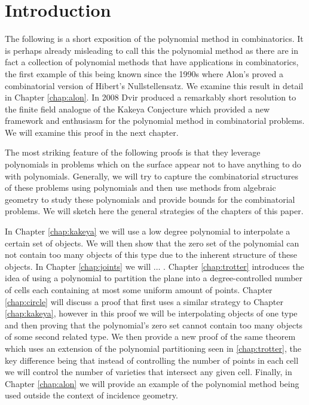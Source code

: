 \chapter{Introduction}

The following is a short exposition of the polynomial method in combinatorics. 
It is perhaps already misleading to call this the polynomial method 
as there are in fact a collection of polynomial methods that have applications in combinatorics, the first example of this being known since the 1990s
where Alon's proved a combinatorial version of Hibert's Nullstellensatz.\cite{alon1999combinatorial} We examine this result in detail
in Chapter \ref{chap:alon}. In 2008 Dvir produced a remarkably short resolution to the finite field analogue of the Kakeya Conjecture which provided
a new framework and enthusiasm for the polynomial method in combinatorial problems. We will examine this proof in the next chapter. 

The most striking feature of the following proofs is that they leverage polynomials in problems which on the surface appear not to have anything to 
do with polynomials. Generally, we will try to capture the combinatorial structures of these problems using polynomials and then use methods from algebraic
geometry to study these polynomials and provide bounds for the combinatorial problems.
We will sketch here the general strategies of the chapters of this paper.

In Chapter \ref{chap:kakeya} we will use a low degree polynomial to interpolate a certain set of objects. We will then show that the zero set of the polynomial can not contain 
too many objects of this type due to the inherent structure of these objects. In Chapter \ref{chap:joints} we will $\dots$ .
Chapter \ref{chap:trotter} introduces the idea of using a polynomial to partition the plane into a degree-controlled number of cells each containing at most some uniform amount of points.
Chapter \ref{chap:circle} will discuss a proof that first uses a similar strategy to Chapter \ref{chap:kakeya}, however in this proof we will be interpolating
objects of one type and then proving that the polynomial's zero set cannot contain too many objects of some second related type. 
We then provide a new proof of the same theorem which uses an extension of the polynomial partitioning seen in \ref{chap:trotter}, the key difference being that
instead of controlling the number of points in each cell we will control the number of varieties that intersect any given cell. Finally, in Chapter \ref{chap:alon} we will provide an example
of the polynomial method being used outside the context of incidence geometry.

